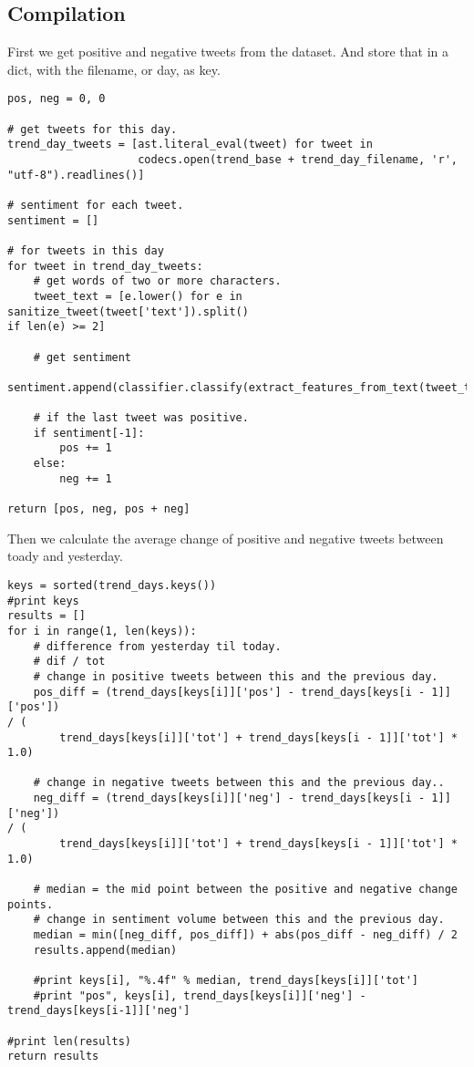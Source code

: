 \subsection{Compilation}

First we get positive and negative tweets from the dataset. And store that in a
dict, with the filename, or day, as key. 
\begin{verbatim}
pos, neg = 0, 0

# get tweets for this day.
trend_day_tweets = [ast.literal_eval(tweet) for tweet in
                    codecs.open(trend_base + trend_day_filename, 'r',
"utf-8").readlines()]

# sentiment for each tweet.
sentiment = []

# for tweets in this day
for tweet in trend_day_tweets:
    # get words of two or more characters.
    tweet_text = [e.lower() for e in sanitize_tweet(tweet['text']).split()
if len(e) >= 2]

	# get sentiment
    sentiment.append(classifier.classify(extract_features_from_text(tweet_text)))

    # if the last tweet was positive.
    if sentiment[-1]:
        pos += 1
    else:
        neg += 1

return [pos, neg, pos + neg]
\end{verbatim}

Then we calculate the average change of positive and negative tweets between
toady and yesterday. 
\begin{verbatim}
keys = sorted(trend_days.keys())
#print keys
results = []
for i in range(1, len(keys)):
    # difference from yesterday til today.
    # dif / tot
    # change in positive tweets between this and the previous day.
    pos_diff = (trend_days[keys[i]]['pos'] - trend_days[keys[i - 1]]['pos'])
/ (
        trend_days[keys[i]]['tot'] + trend_days[keys[i - 1]]['tot'] * 1.0)

    # change in negative tweets between this and the previous day..
    neg_diff = (trend_days[keys[i]]['neg'] - trend_days[keys[i - 1]]['neg'])
/ (
        trend_days[keys[i]]['tot'] + trend_days[keys[i - 1]]['tot'] * 1.0)

    # median = the mid point between the positive and negative change
points.
    # change in sentiment volume between this and the previous day.
    median = min([neg_diff, pos_diff]) + abs(pos_diff - neg_diff) / 2
    results.append(median)

    #print keys[i], "%.4f" % median, trend_days[keys[i]]['tot']
    #print "pos", keys[i], trend_days[keys[i]]['neg'] -
trend_days[keys[i-1]]['neg']

#print len(results)
return results
\end{verbatim}

